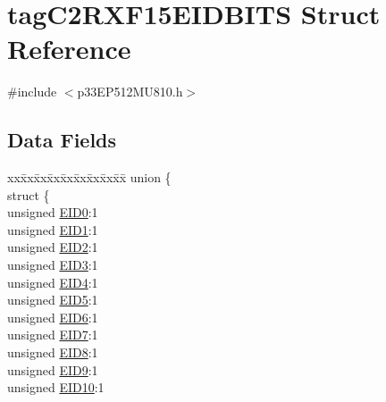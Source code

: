 \hypertarget{structtag_c2_r_x_f15_e_i_d_b_i_t_s}{}\section{tag\+C2\+R\+X\+F15\+E\+I\+D\+B\+I\+TS Struct Reference}
\label{structtag_c2_r_x_f15_e_i_d_b_i_t_s}


{\ttfamily \#include $<$p33\+E\+P512\+M\+U810.\+h$>$}

\subsection*{Data Fields}
\begin{DoxyCompactItemize}
\item 
\begin{tabbing}
xx\=xx\=xx\=xx\=xx\=xx\=xx\=xx\=xx\=\kill
union \{\\
\>struct \{\\
\>\>unsigned \hyperlink{structtag_c2_r_x_f15_e_i_d_b_i_t_s_a9da8b7b30247e4f9cd8cc056549aa9fd}{EID0}:1\\
\>\>unsigned \hyperlink{structtag_c2_r_x_f15_e_i_d_b_i_t_s_afd6c139491d147c1262f3d051c6691e9}{EID1}:1\\
\>\>unsigned \hyperlink{structtag_c2_r_x_f15_e_i_d_b_i_t_s_a36ec62d8d3c5acd5d15e6691dc099a94}{EID2}:1\\
\>\>unsigned \hyperlink{structtag_c2_r_x_f15_e_i_d_b_i_t_s_ab895f7d0ac289a0383b607cbc62eebe2}{EID3}:1\\
\>\>unsigned \hyperlink{structtag_c2_r_x_f15_e_i_d_b_i_t_s_a136d5a709d6618d40acceccb43036656}{EID4}:1\\
\>\>unsigned \hyperlink{structtag_c2_r_x_f15_e_i_d_b_i_t_s_a8dffb2d86a6c184df505ae7c71a58710}{EID5}:1\\
\>\>unsigned \hyperlink{structtag_c2_r_x_f15_e_i_d_b_i_t_s_af8a8574102515d8f1a4b7fd1685d0532}{EID6}:1\\
\>\>unsigned \hyperlink{structtag_c2_r_x_f15_e_i_d_b_i_t_s_a84c3262e67f8d5fd387ac10bde6fa9b1}{EID7}:1\\
\>\>unsigned \hyperlink{structtag_c2_r_x_f15_e_i_d_b_i_t_s_acca25e0b7d86eb499d01f85222baea87}{EID8}:1\\
\>\>unsigned \hyperlink{structtag_c2_r_x_f15_e_i_d_b_i_t_s_ac6748f73d4ada8538b06548be4f396c2}{EID9}:1\\
\>\>unsigned \hyperlink{structtag_c2_r_x_f15_e_i_d_b_i_t_s_a9cea8e77ecbb72bd3b08102412793725}{EID10}:1\\

\end{tabbing}
\end{DoxyCompactItemize}
